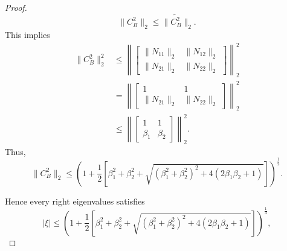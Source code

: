 \documentclass[10pt,a4paper]{amsart}
\begin{document}
\begin{proof}
$$ \|C_{B}^{2}\|_2 \leq \|\tilde{C_{B}^{2}}\|_2. $$
This implies
\begin{align*}
   \|C_{B}^{2}\|^2_{2} &\le \left\| \begin{bmatrix} \|N_{11}\|_{2} &\|N_{12}\|_{2}\\ \|N_{21}\|_{2} & \|N_{22}\|_{2}\end{bmatrix} \right\|^2_{2} \\&=\left\| \begin{bmatrix} 1 &1\\ \|N_{21}\|_{2} & \|N_{22}\|_{2} \end{bmatrix} \right\|^2_{2}\\&\le \left\|\begin{bmatrix} 1 &1\\ \beta_{1} & \beta_{2} \end{bmatrix}\right\|^2_{2}.
\end{align*}
Thus, 
$$ \|C_{B}^{2}\|_{2} \le \left( 1+\frac{1}{2} \left[ \beta^{2}_{1} + \beta^{2}_{2} +\sqrt{(\beta^{2}_{1}+\beta^{2}_{2})^{2}+4\left(2\beta_{1}\beta_{2} + 1 \right) }\right] \right)^{\frac{1}{2}}.$$

\noindent Hence every right eigenvalues satisfies $$|\xi| \le \left( 1+\frac{1}{2} \left[ \beta^{2}_{1} + \beta^{2}_{2} +\sqrt{(\beta^{2}_{1}
+\beta^{2}_{2})^{2}+4\left(2\beta_{1}\beta_{2} + 1 \right) }\right] \right)^{\frac{1}{4}},$$
\end{proof}
\end{document}
